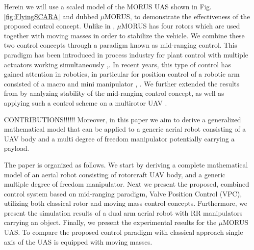 Herein we will use a scaled model of the MORUS UAS shown in Fig. \ref{fig:FlyingSCARA} and dubbed $\mu$MORUS, to demonstrate the effectiveness of the proposed control concept. Unlike in \cite{bermes2008new}, $\mu$MORUS has four rotors which are used together with moving masses in order to stabilize the vehicle. We combine these two control concepts through a paradigm known as mid-ranging control. This paradigm has been introduced in process industry for plant control with multiple actuators working simultaneously \cite{Allison1997MidRanging},\cite{Allison2003MidRanging}. In recent years, this type of control has gained attention in robotics, in particular for position control of a robotic arm consisted of a macro and mini manipulator \cite{Sornmo2013AdaptiveImc}, \cite{Ma2015MidRanging}. We further extended the results from \cite{Haus2017} by analyzing stability of the mid-ranging control concept, as well as applying such a control scheme on a multirotor UAV \cite{haus2018med}. 

CONTRIBUTIONS!!!!!! Moreover, in this paper we aim to derive a generalized mathematical model that can be applied to a generic aerial robot consisting of a UAV body and a multi degree of freedom manipulator potentially carrying a payload. 

The paper is organized as follows. We start by deriving a complete mathematical model of an aerial robot consisting of rotorcraft UAV body, and a generic multiple degree of freedom manipulator. Next we present the proposed, combined control system based on mid-ranging paradigm, Valve Position Control (VPC), utilizing both classical rotor and moving mass control concepts. Furthermore, we present the simulation results of a dual arm aerial robot with RR  manipulators carrying an object. Finally, we present the experimental results for the $\mu$MORUS UAS. To compare the proposed control paradigm with classical approach single axis of the UAS is equipped with moving masses.